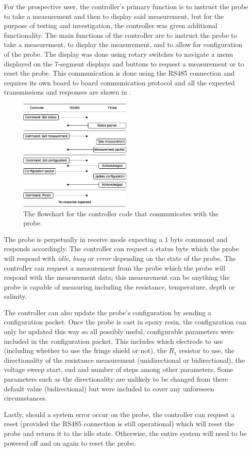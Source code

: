 For the prospective user, the controller's primary function is to instruct the probe to take a measurement and then to display said measurement, but for the purpose of testing and investigation, the controller was given additional functionality.
The main functions of the controller are to instruct the probe to take a measurement, to display the measurement, and to allow for configuration of the probe.
The display was done using rotary switches to navigate a menu displayed on the 7-segment displays and buttons to request a measurement or to reset the probe.
This communication is done using the RS485 connection and requires its own board to board communication protocol and all the expected transmissions and responses are shown in .

\begin{figure}[h]
    \centering
    \includegraphics[width=0.5\textwidth]{Figures/rs485_flowchart}
    \caption{The flowchart for the controller code that communicates with the probe.}
    \label{fig:rs485-flowchart} %
\end{figure}

The probe is perpetually in receive mode expecting a 1 byte command and responds accordingly.
The controller can request a status byte which the probe will respond with \textit{idle}, \textit{busy} or \textit{error} depending on the state of the probe.
The controller can request a measurement from the probe which the probe will respond with the measurement data; this measurement can be anything the probe is capable of measuring including the resistance, temperature, depth or salinity.

The controller can also update the probe's configuration by sending a configuration packet.
Once the probe is cast in epoxy resin, the configuration can only be updated this way so all possibly useful, configurable parameters were included in the configuration packet.
This includes which electrode to use (including whether to use the fringe shield or not), the $R_1$ resistor to use, the directionality of the resistance measurement (unidirectional or bidirectional), the voltage sweep start, end and number of steps among other parameters.
Some parameters such as the directionality are unlikely to be changed from there default value (bidirectional) but were included to cover any unforeseen circumstances.

Lastly, should a system error occur on the probe, the controller can request a reset (provided the RS485 connection is still operational) which will reset the probe and return it to the idle state.
Otherwise, the entire system will need to be powered off and on again to reset the probe.